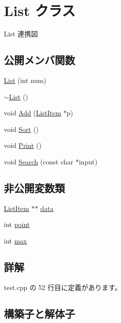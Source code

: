 \hypertarget{class_list}{}\section{List クラス}
\label{class_list}


List 連携図
\subsection*{公開メンバ関数}
\begin{DoxyCompactItemize}
\item 
\hyperlink{class_list_a1fa6361e0cbcad09ed3e748b22eb1e19}{List} (int num)
\item 
\hyperlink{class_list_a70aecf37bd9d779a394e4d50377fbf5f}{$\sim$\+List} ()
\item 
void \hyperlink{class_list_a593e13086a1d135ac9efb530d26cd94b}{Add} (\hyperlink{class_list_item}{List\+Item} $\ast$p)
\item 
void \hyperlink{class_list_ac59284ff8d930a99616e9a13d49f92b4}{Sort} ()
\item 
void \hyperlink{class_list_a071cb188f9bb9bb8d1d79e6f939c586c}{Print} ()
\item 
void \hyperlink{class_list_a518ec1c2a0f0331d4f5fd5733e197d0c}{Search} (const char $\ast$input)
\end{DoxyCompactItemize}
\subsection*{非公開変数類}
\begin{DoxyCompactItemize}
\item 
\hyperlink{class_list_item}{List\+Item} $\ast$$\ast$ \hyperlink{class_list_a0fd821411e5922f1733b2afe207f6b28}{data}
\item 
int \hyperlink{class_list_ab03801c8c3765b381b45a306d34f5daa}{point}
\item 
int \hyperlink{class_list_a73fc93ef327ff5f4bb35fd628b658d50}{max}
\end{DoxyCompactItemize}


\subsection{詳解}


 test.\+cpp の 52 行目に定義があります。



\subsection{構築子と解体子}
\mbox{\label{class_list_a1fa6361e0cbcad09ed3e748b22eb1e19}} 
